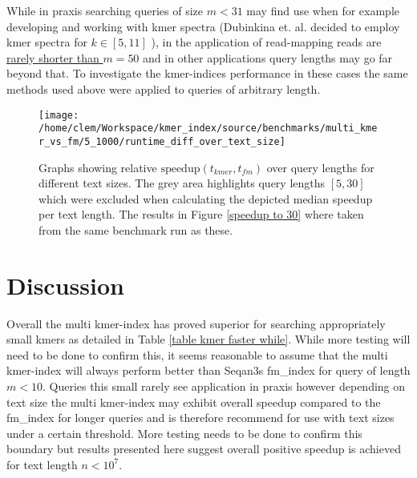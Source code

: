 While in praxis searching queries of size $m<31$ may find use when for example developing and working with kmer spectra
(Dubinkina et. al. decided to employ kmer spectra for $k\in[5, 11]$ \cite{kmer:spectrum:dissimilarity}),
in the application of read-mapping reads are
\href{https://www.illumina.com/science/technology/next-generation-sequencing/plan-experiments/read-length.html}{rarely shorter than $m=50$}
and in other applications query lengths may go far beyond that. To investigate the kmer-indices performance in these cases
the same methods used above were applied to queries of arbitrary length. \newpage

\begin{figure}[H]
\texttt{[image: /home/clem/Workspace/kmer\_index/source/benchmarks/multi\_kmer\_vs\_fm/5\_1000/runtime\_diff\_over\_text\_size]}\caption{\label{figure 5_100}
Graphs showing relative $\text{speedup}(t_{kmer},t_{fm})$ over
query lengths for different text sizes. The grey area highlights query
lengths $[5, 30]$ which were excluded when calculating the depicted median speedup per text length. The results in Figure
\ref{speedup to 30} where taken from the same benchmark run as these.}
\end{figure}

\section{Discussion}
Overall the multi kmer-index has proved superior for searching appropriately small kmers as detailed in Table
\ref{table kmer faster while}. While more testing will need to be done to confirm this, it seems reasonable to assume
that the multi kmer-index will always perform better than Seqan3s fm\_index for query of length $m<10$. Queries this small
rarely see application in praxis however depending on text size the multi kmer-index may
exhibit overall speedup compared to the fm\_index for longer queries and is therefore recommend for use with text sizes
under a certain threshold. More testing needs to be done to confirm this boundary but results presented here suggest
overall positive speedup is achieved for text length $n<10^{7}$.


